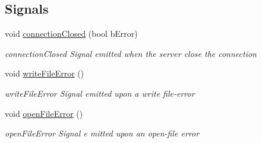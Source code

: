 \subsection*{Signals}
\begin{DoxyCompactItemize}
\item 
void \mbox{\hyperlink{classFileUpdater_af460a6c15c3d606b7206650112477a28}{connection\+Closed}} (bool b\+Error)
\begin{DoxyCompactList}\small\item\em connection\+Closed Signal emitted when the server close the connection \end{DoxyCompactList}\item 
\mbox{\label{classFileUpdater_a95c2170781d8e727720cb1dbd8c5e350}} 
void \mbox{\hyperlink{classFileUpdater_a95c2170781d8e727720cb1dbd8c5e350}{write\+File\+Error}} ()
\begin{DoxyCompactList}\small\item\em write\+File\+Error Signal emitted upon a write file-\/error \end{DoxyCompactList}\item 
\mbox{\label{classFileUpdater_a1891cde11d15a41d8a4282a73fa9598c}} 
void \mbox{\hyperlink{classFileUpdater_a1891cde11d15a41d8a4282a73fa9598c}{open\+File\+Error}} ()
\begin{DoxyCompactList}\small\item\em open\+File\+Error Signal e mitted upon an open-\/file error \end{DoxyCompactList}\end{DoxyCompactItemize}
